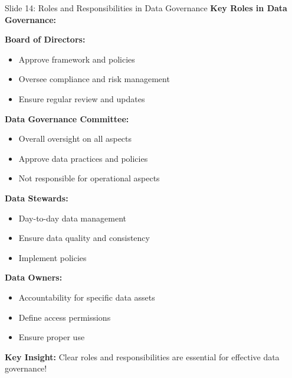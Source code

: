 \documentclass[8pt]{beamer}
\begin{document}
	\begin{frame}{Slide 14: Roles and Responsibilities in Data Governance}
		\fontsize{6.5}{7.5}\selectfont
		\textbf{Key Roles in Data Governance:}
		
		\vspace{0.1cm}
		\textbf{Board of Directors:}
		\begin{itemize}
			\item Approve framework and policies
			\item Oversee compliance and risk management
			\item Ensure regular review and updates
		\end{itemize}
		
		\vspace{0.1cm}
		\textbf{Data Governance Committee:}
		\begin{itemize}
			\item Overall oversight on all aspects
			\item Approve data practices and policies
			\item Not responsible for operational aspects
		\end{itemize}
		
		\vspace{0.1cm}
		\textbf{Data Stewards:}
		\begin{itemize}
			\item Day-to-day data management
			\item Ensure data quality and consistency
			\item Implement policies
		\end{itemize}
		
		\vspace{0.1cm}
		\textbf{Data Owners:}
		\begin{itemize}
			\item Accountability for specific data assets
			\item Define access permissions
			\item Ensure proper use
		\end{itemize}
		
		\textcolor{myblue}{\textbf{Key Insight:}} Clear roles and responsibilities are \textcolor{myblue}{essential for effective data governance}!
	\end{frame}
	
\end{document}

